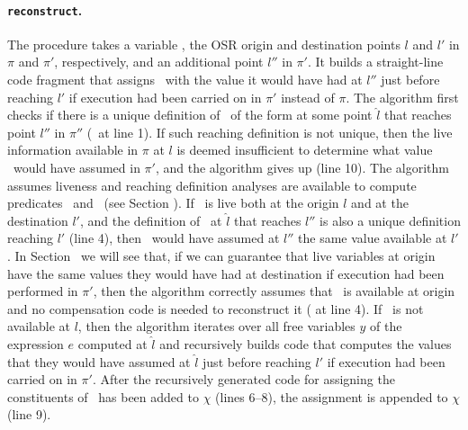 \paragraph*{\texttt{reconstruct}.} The procedure  takes a variable \wx, the OSR origin and destination points $l$ and $l'$ in $\pi$ and $\pi'$, respectively, and an additional point $l''$ in $\pi'$. It builds a straight-line code fragment that assigns \wx\ with the value it would have had at $l''$ just before reaching $l'$ if execution had been carried on in $\pi'$ instead of $\pi$. The algorithm first checks if there is a unique definition of \wx\ of the form  at some point $\hat{l}$ that reaches point $l''$ in $\pi''$ (\ureachdef\ at line 1). If such reaching definition is not unique, then the live information available in $\pi$ at $l$ is deemed insufficient to determine what value \wx\ would have assumed in $\pi'$, and the algorithm gives up (line 10). %
The algorithm assumes liveness and reaching definition analyses are available to compute predicates \live\ and \ureachdef\ (see Section \missing). If \wx\ is live both at the origin $l$ and at the destination $l'$, and the definition of \wx\ at $\hat{l}$ that reaches $l''$ is also a unique definition reaching $l'$ (line 4), then \wx\ would have assumed at $l''$ the same value available at $l'$. In Section \missing\ we will see that, if we can guarantee that live variables at origin have the same values they would have had at destination if execution had been performed in $\pi'$, then the algorithm correctly assumes that \wx\ is available at origin and no compensation code is needed to reconstruct it ( at line 4). If \wx\ is not available at $l$, then the algorithm iterates over all free variables $y$ of the expression $e$ computed at $\hat{l}$ and recursively builds code that computes the values that they would have assumed at $\hat{l}$ just before reaching $l'$ if execution had been carried on in $\pi'$. After the recursively generated code for assigning the constituents of \we\ has been added to $\chi$ (lines 6--8), the assignment  is appended to $\chi$ (line 9).
